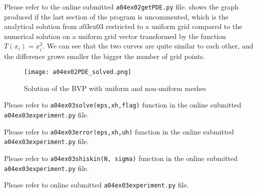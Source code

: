 
Please refer to the online submitted \texttt{a04ex02getPDE.py} file.  shows the graph produced if the last section of the program is uncommented, which is the analytical solution from a03ex03 restricted to a uniform grid compared to the numerical solution on a uniform grid vector transformed by the function $T(x_i)=x_i^2$.
We can see that the two curves are quite similar to each other, and the difference grows smaller the bigger the number of grid points. 

\begin{figure}
	\centering
	\texttt{[image: a04ex02PDE\_solved.png]} 
	\caption{Solution of the BVP with uniform and non-uniform meshes}
	\label{fig:a04e02PDE_solve}
\end{figure}

%
%
Please refer to \texttt{a04ex03solve(eps,xh,flag)} function in the online submitted \texttt{a04ex03experiment.py} file.

%
Please refer to \texttt{a04ex03error(eps,xh,uh)} function in the online submitted \texttt{a04ex03experiment.py} file.

%
Please refer to \texttt{a04ex03shiskin(N, sigma)} function in the online submitted \texttt{a04ex03experiment.py} file.

%
Please refer to online submitted \texttt{a04ex03experiment.py} file.
